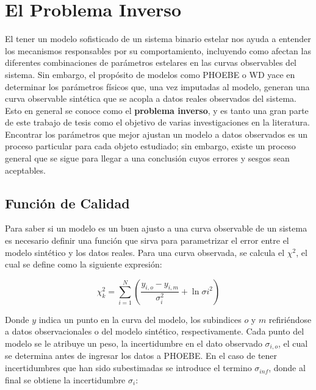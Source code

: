 \section{El Problema Inverso}

El tener un modelo sofisticado de un sistema binario estelar nos ayuda a
entender los mecanismos responsables por su comportamiento, incluyendo como
afectan las diferentes combinaciones de parámetros estelares en las curvas
observables del sistema. Sin embargo, el propósito de modelos como PHOEBE o WD
yace en determinar los parámetros físicos que, una vez imputadas al modelo,
generan una curva observable sintética que se acopla a datos reales observados
del sistema. Esto en general se conoce como el \textbf{problema inverso}, y es
tanto una gran parte de este trabajo de tesis como el objetivo de varias
investigaciones en la literatura. Encontrar los parámetros que mejor ajustan un
modelo a datos observados es un proceso particular para cada objeto estudiado;
sin embargo, existe un proceso general que se sigue para llegar a una conclusión
cuyos errores y sesgos sean aceptables.

\subsection{Función de Calidad}

Para saber si un modelo es un buen ajusto a una curva observable de un sistema
es necesario definir una función que sirva para parametrizar el error entre el
modelo sintético y los datos reales. Para una curva observada, se calcula el
$\chi^2$, el cual se define como la siguiente expresión:

\begin{eqfloat}[!ht]
	\centering
	\begin{equation}
		\chi_{k}^2 = \sum_{i=1}^{N}{\left(\frac{y_{i,o} - y_{i,m}}{\sigma_{i}^2} + \ln{\sigma{i}^2}\right)}
	\end{equation}
	\blankcaption
	\label{ecuacionPhoebeChi2Curve}
\end{eqfloat}

Donde $y$ indica un punto en la curva del modelo, los subindices $o$ y $m$
refiriéndose a datos observacionales o del modelo sintético, respectivamente.
Cada punto del modelo se le atribuye un peso, la incertidumbre en el dato
observado $\sigma_{i,o}$, el cual se determina antes de ingresar los datos a
PHOEBE. En el caso de tener incertidumbres que han sido subestimadas se
introduce el termino $\sigma_{inf}$, donde al final se obtiene la incertidumbre
$\sigma_{i}$:

